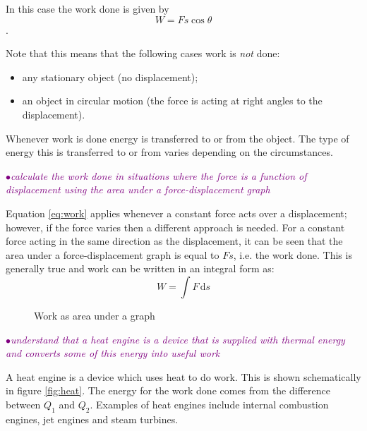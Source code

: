 \documentclass[a4paper,11pt,twoside]{memoir}
\newcommand{\ud}{\,\mathrm{d}}
\newcounter{spec}[chapter]
\newcommand{\spec}[1]{\Needspace{5\baselineskip}\textcolor{purple}{$\bullet$\hspace{0.5cm}\textit{#1}}}
\begin{document}
In this case the work done is given by
 \begin{equation}\label{eq:work}
 W = Fs\cos{\theta}
 \end{equation}.

Note that this means that the following cases work is \emph{not} done:
\begin{itemize}
  \item any stationary object (no displacement);
  \item an object in circular motion (the force is acting at right angles to the displacement).
\end{itemize}

Whenever work is done energy is transferred to or from the object. The type of energy this is transferred to or from varies depending on the circumstances.

\spec{calculate the work done in situations where the force is a function of displacement using the area under a force-displacement graph}

Equation \ref{eq:work} applies whenever a constant force acts over a displacement; however, if the force varies then a different approach is needed. For a constant force acting in the same direction as the displacement, it can be seen that the area under a force-displacement graph is equal to $Fs$, i.e. the work done. This is generally true and work can be written in an integral form as:
\begin{equation}\label{eq:work-integral}
  W = \int F \ud s
\end{equation}

\begin{figure}[h]
  \begin{center}
  \end{center}
  \caption{Work as area under a graph}
  \label{fig:work-graph}
\end{figure}

\spec{understand that a heat engine is a device that is supplied with thermal energy and converts some of this energy into useful work}

A heat engine is a device which uses heat to do work. This is shown schematically in figure \ref{fig:heat}. The energy for the work done comes from the difference between $Q_1$ and $Q_2$.
Examples of heat engines include internal combustion engines, jet engines and steam turbines.
\end{document}
